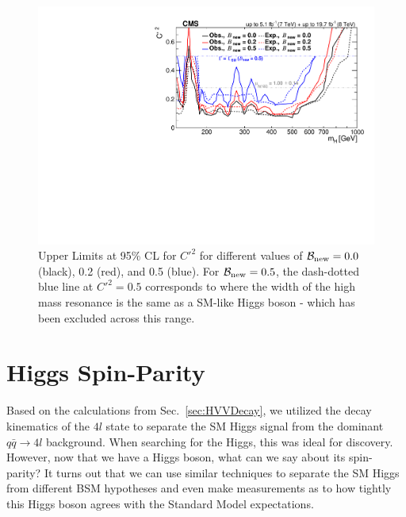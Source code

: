 \begin{figure}[htbp]
\begin{center}
\includegraphics[width=.75\linewidth]{HiggsProperties/figures/combined_BRnewContours.pdf}
\caption[Limits on $C'^2$ for Different Values of $\mathcal{B}_{\rm{new}}$ in the EW Singlet Extension to the Standard Model]{Upper Limits at 95\% CL for $C'^2$ for different values of $\mathcal{B}_{\rm{new}} = 0.0$ (black), 0.2 (red), and 0.5 (blue). For $\mathcal{B}_{\rm{new}} = 0.5$, the dash-dotted blue line at $C'^2 = 0.5$ corresponds to where the width of the high mass resonance is the same as a SM-like Higgs boson - which has been excluded across this range.}
\label{fig:EWSExclusions}
\end{center}
\end{figure}

\section{Higgs Spin-Parity}
\label{sec:SpinParity}

Based on the calculations from Sec.~\ref{sec:HVVDecay}, we utilized the decay kinematics of the $4l$ state to separate the SM Higgs signal from the dominant $q\bar{q}\rightarrow 4l$ background. When searching for the Higgs, this was ideal for discovery. However, now that we have a Higgs boson, what can we say about its spin-parity? It turns out that we can use similar techniques to separate the SM Higgs from different BSM hypotheses and even make measurements as to how tightly this Higgs boson agrees with the Standard Model expectations.


